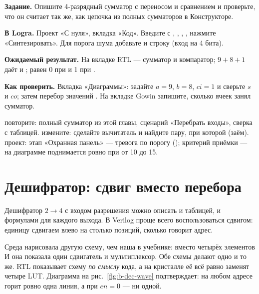 \begin{diybox}
\textbf{Задание.} Опишите 4-разрядный сумматор с переносом и сравнением и проверьте, что он считает так же, как цепочка из полных сумматоров в Конструкторе.

\textbf{В Logra.} Проект «С нуля», вкладка «Код». Введите  с , , , , нажмите «Синтезировать». Для порога шума добавьте  и строку  (вход  на 4 бита).

\textbf{Ожидаемый результат.} На вкладке RTL --- сумматор и компаратор; $9+8+1$ даёт  и ;  равен 0 при  и 1 при .

\textbf{Как проверить.} Вкладка «Диаграммы»: задайте $a=9$, $b=8$, $ci=1$ и сверьте $s$ и $co$; затем перебор значений . На вкладке Gowin запишите, сколько ячеек занял сумматор.

 повторите: полный сумматор  из этой главы, сценарий «Перебрать входы», сверка с таблицей.  измените: сделайте вычитатель  и найдите пару, при которой  (заём).  проект: этап «Охранная панель» --- тревога по порогу (); критерий приёмки --- на диаграмме  поднимается ровно при  от 10 до 15.
\end{diybox}

\section{Дешифратор: сдвиг вместо перебора}

Дешифратор $2\to 4$ с входом разрешения можно описать и таблицей, и
формулами для каждого выхода. В Verilog проще всего воспользоваться сдвигом:
единицу сдвигаем влево на столько позиций, сколько говорит адрес.



Среда нарисовала другую схему, чем наша в учебнике: вместо четырёх элементов
И она показала один сдвигатель \code{<<} и мультиплексор. Обе схемы делают
одно и то же. RTL показывает схему \emph{по смыслу} кода, а на кристалле её
всё равно заменят четыре LUT. Диаграмма на рис.~\ref{fig:b-dec-wave}
подтверждает: на любом адресе горит ровно одна линия, а при $en = 0$ --- ни
одной.


